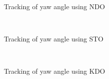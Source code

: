 \documentclass[letterpaper%
, twoside%
, 12pt%
,memoire%
, english%
,creativecommons,hyperref%
]{thETS}
\theoremstyle{newThmStyle}
\begin{document}
\begin{figure}[H]
\centering
{}
\\ \parbox{0.75\textwidth}{\caption{Tracking of yaw angle using NDO}
\label{yaw_trac_dis_m1_ndo}}
\end{figure}

\begin{figure}[H]
\centering
{}
\\ \parbox{0.75\textwidth}{\caption{Tracking of yaw angle using STO}
\label{yaw_trac_dis_m1_sto}}
\end{figure}

\begin{figure}[H]
\centering
{}
\\ \parbox{0.75\textwidth}{\caption{Tracking of yaw angle using KDO}
\label{yaw_trac_dis_m1_kdo}}
\end{figure}
\end{document}
